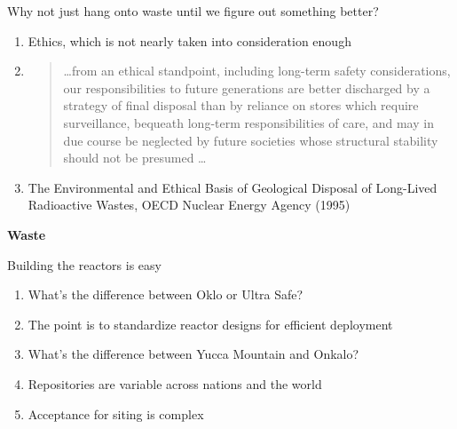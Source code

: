 \documentclass[aspectratio=1610,pdftex,dvipsnames,compress,xcolor={dvipsnames}]{beamer}
\begin{document}
\begin{frame}{Why not just hang onto waste until we figure out something better?}
    \begin{enumerate}[series=outerlist,topsep=0pt,itemsep=21pt,leftmargin=*,label=(\arabic*)]
        \item[]Ethics, which is not nearly taken into consideration enough
        \item[]
            \begin{quote}
                \ldots from an ethical standpoint, including long-term safety considerations, our responsibilities to future generations are better discharged by a strategy of final disposal than by reliance on stores which require surveillance, bequeath long-term responsibilities of care, and may in due course be neglected by future societies whose
structural stability should not be presumed \ldots
            \end{quote}
        \item[]The Environmental and Ethical Basis of Geological Disposal of Long-Lived Radioactive Wastes, OECD Nuclear Energy Agency (1995)
    \end{enumerate}
\end{frame}


\begin{frame}[plain]{}
    \centering\LARGE\textbf{Waste}
\end{frame}


\addtocounter{framenumber}{-1} 
\begin{frame}{Building the reactors is easy}
    \begin{enumerate}[series=outerlist,topsep=0pt,itemsep=21pt,leftmargin=*,label=(\arabic*)]
        \item[]What's the difference between Oklo or Ultra Safe?
        \item[]The point is to standardize reactor designs for efficient deployment
        \item[]What's the difference between Yucca Mountain and Onkalo?
        \item[]Repositories are variable across nations and the world
        \item[]Acceptance for siting is complex
    \end{enumerate}
\end{frame}
\end{document}
